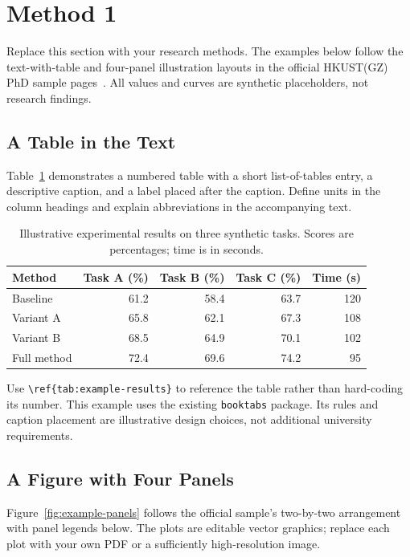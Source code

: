 \section{Method 1}

Replace this section with your research methods. The examples below follow
 the text-with-table and four-panel illustration layouts in the official
HKUST(GZ) PhD sample pages~\citep{phd}. All values and curves are synthetic
placeholders, not research findings.

\subsection{A Table in the Text}
Table~\ref{tab:example-results} demonstrates a numbered table with a short
list-of-tables entry, a descriptive caption, and a label placed after the
caption. Define units in the column headings and explain abbreviations in
 the accompanying text.

\begin{table}[htbp]
  \centering
  \caption[Illustrative experimental results]{Illustrative experimental
    results on three synthetic tasks. Scores are percentages; time is in seconds.}
  \label{tab:example-results}
  \begin{tabular}{lrrrr}
    \toprule
    Method & Task A (\%) & Task B (\%) & Task C (\%) & Time (s) \\
    \midrule
    Baseline & 61.2 & 58.4 & 63.7 & 120 \\
    Variant A & 65.8 & 62.1 & 67.3 & 108 \\
    Variant B & 68.5 & 64.9 & 70.1 & 102 \\
    Full method & 72.4 & 69.6 & 74.2 & 95 \\
    \bottomrule
  \end{tabular}
\end{table}

Use \verb|\ref{tab:example-results}| to reference the table rather than
hard-coding its number. This example uses the existing \texttt{booktabs}
package. Its rules and caption placement are illustrative design choices,
not additional university requirements.

\clearpage
\subsection{A Figure with Four Panels}
Figure~\ref{fig:example-panels} follows the official sample's two-by-two
arrangement with panel legends below. The plots are editable vector graphics;
replace each plot with your own PDF or a sufficiently high-resolution image.

